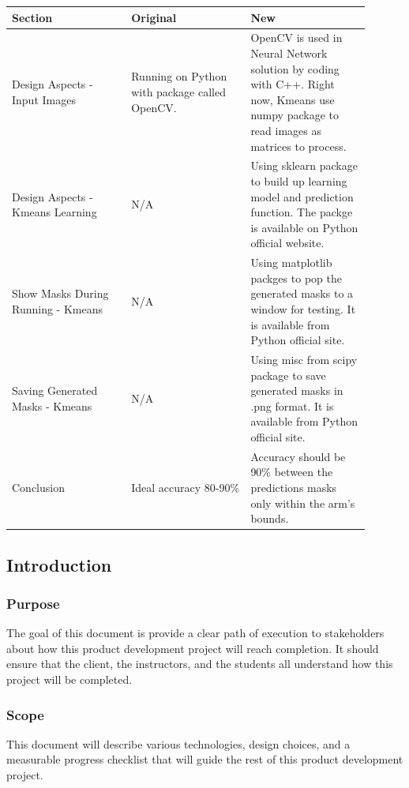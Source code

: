 \documentclass[10pt,journal,compsoc, draftclsnofoot,onecolumn]{IEEEtran}
\begin{document}
\begin{center}
\begin{tabular}{|p{0.3\linewidth}|p{0.3\linewidth}|p{0.3\linewidth}|}
\hline
Section & Original & New \\ [0.5ex]
\hline\hline

Design Aspects - Input Images
&
Running on Python with package called OpenCV.
&
OpenCV is used in Neural Network solution by coding with C++. Right now, Kmeans use numpy package to read images as matrices to process.
\\ \hline

Design Aspects - Kmeans Learning
&
N/A
&
Using sklearn package to build up learning model and prediction function. The packge is available on Python official website.
\\ \hline

Show Masks During Running - Kmeans
&
N/A
&
Using matplotlib packges to pop the generated masks to a window for testing. It is available from Python official site.
\\ \hline

Saving Generated Masks - Kmeans
&
N/A
&
Using misc from scipy package to save generated masks in .png format. It is available from Python official site.
\\ \hline

Conclusion
&
Ideal accuracy 80-90\%
&
Accuracy should be 90\% between the predictions masks only within the arm's bounds.
\\ \hline
\end{tabular}
\end{center}

\subsection{Introduction}
\subsubsection{Purpose}
The goal of this document is provide a clear path of execution to stakeholders about how this product development project will reach completion.
It should ensure that the client, the instructors, and the students all understand how this project will be completed.

\subsubsection{Scope}
This document will describe various technologies, design choices, and a measurable progress checklist that will guide the rest of this product development project.
\end{document}
